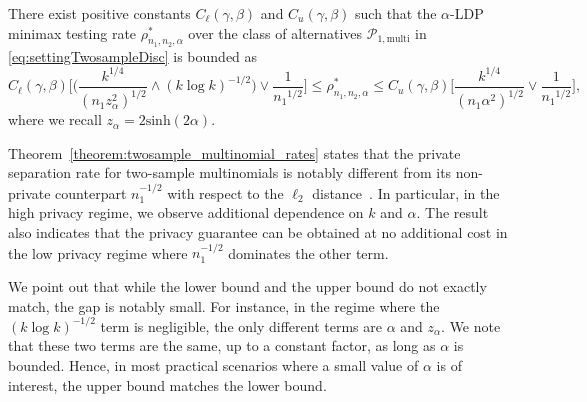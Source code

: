 \documentclass[twoside,11pt]{article}
\newcommand{\minSep}{\rho} %
\newcommand{\minimaxTestingRateTwosampleLDP}{\minSep^\ast_{\sampleSize_1, \sampleSize_2, \privacyParameter}}
\newcommand{\alphabetSize}{k} %
\newcommand{\sampleSize}{n}
\newcommand{\privacyParameter}{\alpha} %
\newcommand{\maxErrorTypeTwo}{\beta} %
\newcommand{\maxErrorTypeOne}{\gamma} %
\begin{document}
\begin{theorem}
	\label{theorem:twosample_multinomial_rates}There exist positive constants 
	$C_\ell(\maxErrorTypeOne, \maxErrorTypeTwo)$ and $C_u(\maxErrorTypeOne, \maxErrorTypeTwo)$
	such that the $\privacyParameter$-LDP minimax testing rate $\minimaxTestingRateTwosampleLDP$ over the class of alternatives $\mathcal{P}_{1,\mathrm{multi}}$ in \eqref{eq:settingTwosampleDisc} is bounded as
	\begin{equation}\label{rate:twosample_disc}
		C_\ell(\maxErrorTypeOne, \maxErrorTypeTwo)
		\Bigg[
		\biggl(
		\frac
		{\alphabetSize^{1/4}}
		{(\sampleSize_1 z_{\alpha}^2)^{1/2}}
		\wedge
		(\alphabetSize \log \alphabetSize)^{-1/2}
		\biggr)
		\vee
		\frac
		{1}
		{{\sampleSize_1}^{1/2}}
		\Biggr]
		\leq
		\minimaxTestingRateTwosampleLDP
		\leq
		C_u(\maxErrorTypeOne, \maxErrorTypeTwo)
		\biggl[
		\frac
		{\alphabetSize^{1/4}}
		{(\sampleSize_1 \alpha^2)^{1/2}} 
		\vee
		\frac
		{1}
		{{\sampleSize_1}^{1/2}}
		\biggr],
	\end{equation}
	where we recall $z_\alpha = 2 \mathrm{sinh}(2\alpha)$.
\end{theorem}

Theorem~\ref{theorem:twosample_multinomial_rates} states that the private separation rate for two-sample multinomials is notably different from its non-private counterpart $\sampleSize_1^{-1/2}$ with respect to the $\ell_2$ distance~\citep{chan2014optimal,kim_minimax_2022}. In particular, in the high privacy regime, we observe additional dependence on $\alphabetSize$ and $\privacyParameter$. The result also indicates that the privacy guarantee can be obtained at no additional cost in the low privacy regime where $\sampleSize_1^{-1/2}$ dominates the other term. 

We point out that while the lower bound and the upper bound do not exactly match, the gap is notably small. For instance, in the regime where the $(\alphabetSize \log \alphabetSize)^{-1/2}$ term is negligible, the only different terms are $\alpha$ and $z_\alpha$. We note that these two terms are the same, up to a constant factor, as long as $\alpha$ is bounded. Hence, in most practical scenarios where a small value of $\alpha$ is of interest, the upper bound matches the lower bound. 
\end{document}
